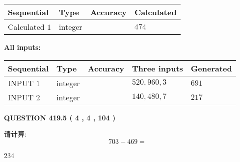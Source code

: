 \documentclass{ctexart}
\begin{document}
   
   
   
\noindent{}
   
   
  
  
\noindent\begin{tabular}{|l|l|l|l|}
\hline
 Sequential & Type & Accuracy & Calculated \\ 
\hline
 
 
  Calculated $  1 $ & integer &  & 
  $ 474 $ 
 \\  \hline  
 \end{tabular}
   
   
   
   
\noindent\vspace{0.1in}\hspace{-0.08in} {\textbf{\Large{All inputs: }}}
   
   
  
  
\noindent\begin{tabular}{|l|l|l|l|l|}
\hline
 Sequential & Type & Accuracy & Three inputs & Generated \\ 
\hline
 
 
  INPUT $  1 $ & integer &  & $
 520
 , 
 960
 , 
 3
 $ & $ 691 $ 
 \\  \hline  
 
 
  INPUT $  2 $ & integer &  & $
 140
 , 
 480
 , 
 7
 $ & $ 217 $ 
 \\  \hline  
 \end{tabular}
   
   
  
\vspace{0.2in}
  
{\textbf{\Large{QUESTION
419.5 
 ( 4 , 4 , 104 )
}}}
  
  
 
请计算:
\begin{equation}
703 -   %
469 = \nonumber
\end{equation}
 
 
 
\noindent{}
 
 

234
 
 
\noindent{}
 
 

 
 
 
\noindent{}
 
\end{document}
